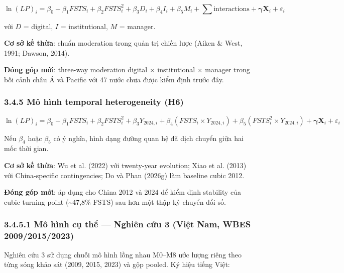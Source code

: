\documentclass[12pt,a4paper]{article}
\begin{document}
\[\ln(LP)_i = \beta_0 + \beta_1 FSTS_i + \beta_2 FSTS_i^2 + \beta_3 D_i + \beta_4 I_i + \beta_5 M_i + \sum \text{interactions} + \boldsymbol{\gamma} \mathbf{X}_i + \varepsilon_i\]

với \(D\) = digital, \(I\) = institutional, \(M\) = manager.

\textbf{Cơ sở kế thừa}: chuẩn moderation trong quản trị chiến lược
(Aiken \& West, 1991; Dawson, 2014).

\textbf{Đóng góp mới}: three-way moderation digital × institutional ×
manager trong bối cảnh châu Á và Pacific với 47 nước chưa được kiểm định
trước đây.

\hypertarget{345-muxf4-huxecnh-temporal-heterogeneity-h6}{%
\subsubsection{3.4.5 Mô hình temporal heterogeneity
(H6)}\label{345-muxf4-huxecnh-temporal-heterogeneity-h6}}

\[\ln(LP)_i = \beta_0 + \beta_1 FSTS_i + \beta_2 FSTS_i^2 + \beta_3 Y_{2024,i} + \beta_4 (FSTS_i \times Y_{2024,i}) + \beta_5 (FSTS_i^2 \times Y_{2024,i}) + \boldsymbol{\gamma} \mathbf{X}_i + \varepsilon_i\]

Nếu \(\beta_4\) hoặc \(\beta_5\) có ý nghĩa, hình dạng đường quan hệ đã
dịch chuyển giữa hai mốc thời gian.

\textbf{Cơ sở kế thừa}: Wu et al. (2022) với twenty-year evolution; Xiao
et al. (2013) với China-specific contingencies; Do và Phan (2026g) làm
baseline cubic 2012.

\textbf{Đóng góp mới}: áp dụng cho China 2012 và 2024 để kiểm định
stability của cubic turning point (\textasciitilde47,8\% FSTS) sau hơn
một thập kỷ chuyển đổi số.

\hypertarget{3451-muxf4-huxecnh-cux1ee5-thux1ec3--nghiuxean-cux1ee9u-3-viux1ec7t-nam-wbes-200920152023}{%
\subsubsection{3.4.5.1 Mô hình cụ thể --- Nghiên cứu 3 (Việt Nam, WBES
2009/2015/2023)}\label{3451-muxf4-huxecnh-cux1ee5-thux1ec3--nghiuxean-cux1ee9u-3-viux1ec7t-nam-wbes-200920152023}}

Nghiên cứu 3 sử dụng chuỗi mô hình lồng nhau M0--M8 ước lượng riêng theo
từng sóng khảo sát (2009, 2015, 2023) và gộp pooled. Ký hiệu tiếng Việt:
\end{document}

